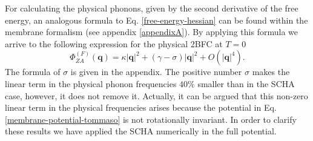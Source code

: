 For calculating the physical phonons, given by the second derivative of the free energy, an analogous formula to 
Eq. \ref{free-energy-hessian} can be found within the membrane formalism (see appendix \ref{appendixA}). By applying 
this formula we arrive to the following expression for the physical 2BFC at $T=0$
\begin{equation}
 \Phi_{ZA}^{(F)}(\boldsymbol{q})=\kappa|\boldsymbol{q}|^{2}+(\gamma-\sigma)|\boldsymbol{q}|^{2}+
 O(|\boldsymbol{q}|^{4}).
\end{equation} 
The formula of $\sigma$ is given in the appendix. The positive number $\sigma$ makes the linear term in the physical 
phonon frequencies $40\%$ smaller than in the SCHA case, however, it does not remove it. Actually, it can be argued 
that this non-zero linear term in the physical frequencies arises because the potential in 
Eq. \ref{membrane-potential-tommaso} is not rotationally invariant. In order to clarify these results we have 
applied the SCHA numerically in the full potential. \\

